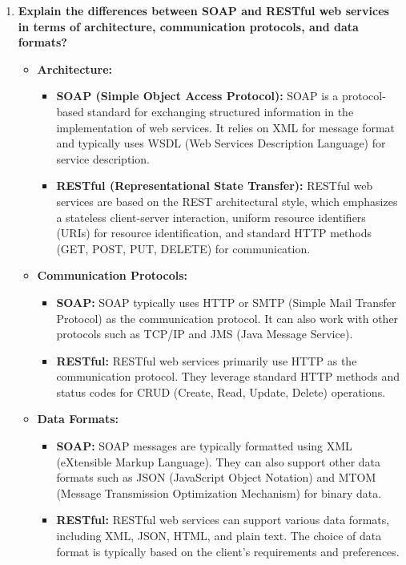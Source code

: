 \documentclass[11pt]{article}
\begin{document}
\begin{enumerate}
    \item \textbf{Explain the differences between SOAP and RESTful web services in terms of architecture, communication protocols, and data formats?}\\
          \begin{itemize}
              \item \textbf{Architecture:}
                    \begin{itemize}
                        \item \textbf{SOAP (Simple Object Access Protocol):} SOAP is a protocol-based standard for exchanging structured information in the implementation of web services. It relies on XML for message format and typically uses WSDL (Web Services Description Language) for service description.
                        \item \textbf{RESTful (Representational State Transfer):} RESTful web services are based on the REST architectural style, which emphasizes a stateless client-server interaction, uniform resource identifiers (URIs) for resource identification, and standard HTTP methods (GET, POST, PUT, DELETE) for communication.
                    \end{itemize}
              \item \textbf{Communication Protocols:}
                    \begin{itemize}
                        \item \textbf{SOAP:} SOAP typically uses HTTP or SMTP (Simple Mail Transfer Protocol) as the communication protocol. It can also work with other protocols such as TCP/IP and JMS (Java Message Service).
                        \item \textbf{RESTful:} RESTful web services primarily use HTTP as the communication protocol. They leverage standard HTTP methods and status codes for CRUD (Create, Read, Update, Delete) operations.
                    \end{itemize}
              \item \textbf{Data Formats:}
                    \begin{itemize}
                        \item \textbf{SOAP:} SOAP messages are typically formatted using XML (eXtensible Markup Language). They can also support other data formats such as JSON (JavaScript Object Notation) and MTOM (Message Transmission Optimization Mechanism) for binary data.
                        \item \textbf{RESTful:} RESTful web services can support various data formats, including XML, JSON, HTML, and plain text. The choice of data format is typically based on the client's requirements and preferences.

\end{itemize}
\end{itemize}
\end{enumerate}
\end{document}
